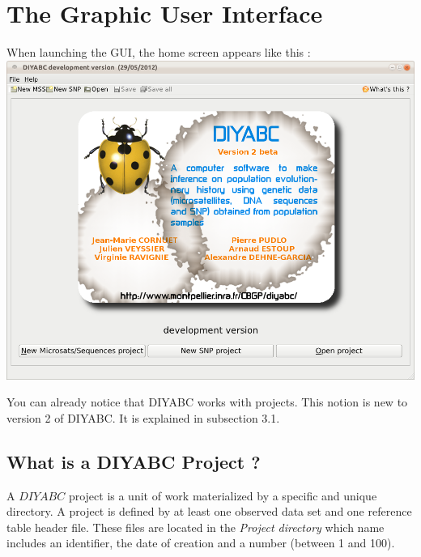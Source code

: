 
\section{The Graphic User Interface}

When launching the GUI, the home screen appears like this :\\


\includegraphics[scale=0.4]{gui_pictures/Capture-DIYABC-1}

You can already notice that DIYABC works with projects. This notion
is new to version 2 of DIYABC. It is explained in subsection 3.1.


\subsection{What is a DIYABC Project ?}

\label{doc_openProjectButton} A $DIYABC$ project is a unit of work
materialized by a specific and unique directory. A project is defined
by at least one observed data set and one reference table header file.
These files are located in the \emph{Project directory} which name
includes an identifier, the date of creation and a number (between
1 and 100).\\


